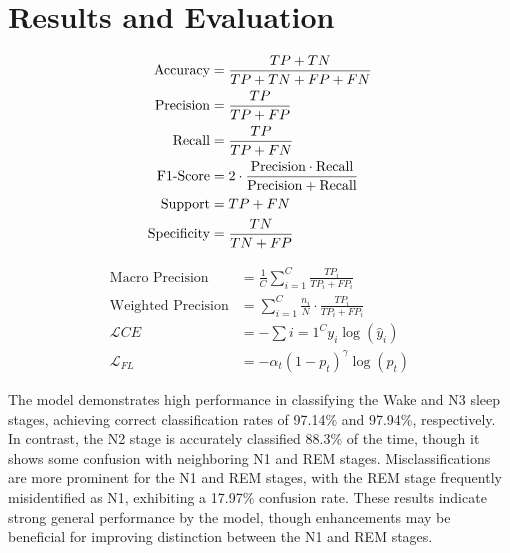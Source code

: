 \section{Results and Evaluation}

\begin{center}
	\begin{minipage}[t]{0.48\textwidth}
		\begin{align}
			\text{Accuracy} &= \frac{TP + TN}{TP + TN + FP + FN} \\
			\text{Precision} &= \frac{TP}{TP + FP} \\
			\text{Recall} &= \frac{TP}{TP + FN} \\
			\text{F1\text{-}Score} &= 2 \cdot \frac{\text{Precision} \cdot \text{Recall}}{\text{Precision} + \text{Recall}} \\
			\text{Support} &= TP + FN \\
			\text{Specificity} &= \frac{TN}{TN + FP}
		\end{align}
	\end{minipage}
	\hfill	
	\begin{minipage}[t]{0.48\textwidth}
		\begin{align}
			\text{Macro Precision} &= \frac{1}{C} \sum_{i=1}^{C} \frac{TP_i}{TP_i + FP_i} \\
			\text{Weighted Precision} &= \sum_{i=1}^{C} \frac{n_i}{N} \cdot \frac{TP_i}{TP_i + FP_i} \\
			\mathcal{L}{CE} &= -\sum{i=1}^{C} y_i \log(\hat{y}_i) \\
			\mathcal{L}_{FL} &= -\alpha_t (1 - p_t)^\gamma \log(p_t)
		\end{align}
	\end{minipage}
\end{center}

The model demonstrates high performance in classifying the Wake and N3 sleep stages, achieving correct classification rates of 97.14\% and 97.94\%, respectively. In contrast, the N2 stage is accurately classified 88.3\% of the time, though it shows some confusion with neighboring N1 and REM stages. Misclassifications are more prominent for the N1 and REM stages, with the REM stage frequently misidentified as N1, exhibiting a 17.97\% confusion rate. These results indicate strong general performance by the model, though enhancements may be beneficial for improving distinction between the N1 and REM stages.

